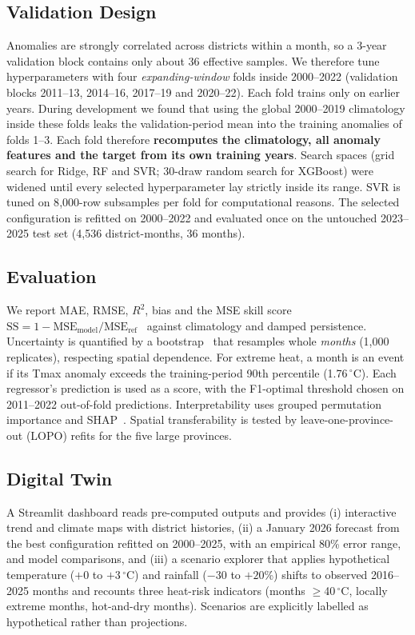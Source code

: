 \documentclass[conference]{IEEEtran}
\newcommand{\degC}{\ensuremath{^\circ}C}
\begin{document}
\subsection{Validation Design}
Anomalies are strongly correlated across districts within a month, so a 3-year validation block contains only about 36 effective samples. We therefore tune hyperparameters with four \emph{expanding-window} folds inside 2000--2022 (validation blocks 2011--13, 2014--16, 2017--19 and 2020--22). Each fold trains only on earlier years. During development we found that using the global 2000--2019 climatology inside these folds leaks the validation-period mean into the training anomalies of folds 1--3. Each fold therefore \textbf{recomputes the climatology, all anomaly features and the target from its own training years}. Search spaces (grid search for Ridge, RF and SVR; 30-draw random search for XGBoost) were widened until every selected hyperparameter lay strictly inside its range. SVR is tuned on 8{,}000-row subsamples per fold for computational reasons. The selected configuration is refitted on 2000--2022 and evaluated once on the untouched 2023--2025 test set (4{,}536 district-months, 36 months).

\subsection{Evaluation}
We report MAE, RMSE, $R^2$, bias and the MSE skill score $\mathrm{SS}=1-\mathrm{MSE}_{\text{model}}/\mathrm{MSE}_{\text{ref}}$~\cite{murphy1988} against climatology and damped persistence. Uncertainty is quantified by a bootstrap~\cite{efron1993} that resamples whole \emph{months} (1{,}000 replicates), respecting spatial dependence. For extreme heat, a month is an event if its Tmax anomaly exceeds the training-period 90th percentile (1.76\,\degC). Each regressor's prediction is used as a score, with the F1-optimal threshold chosen on 2011--2022 out-of-fold predictions. Interpretability uses grouped permutation importance and SHAP~\cite{lundberg2017}. Spatial transferability is tested by leave-one-province-out (LOPO) refits for the five large provinces.

\subsection{Digital Twin}
A Streamlit dashboard reads pre-computed outputs and provides (i) interactive trend and climate maps with district histories, (ii) a January 2026 forecast from the best configuration refitted on 2000--2025, with an empirical 80\% error range, and model comparisons, and (iii) a scenario explorer that applies hypothetical temperature ($+0$ to $+3$\,\degC) and rainfall ($-30$ to $+20$\%) shifts to observed 2016--2025 months and recounts three heat-risk indicators (months $\ge$40\,\degC, locally extreme months, hot-and-dry months). Scenarios are explicitly labelled as hypothetical rather than projections.
\end{document}
